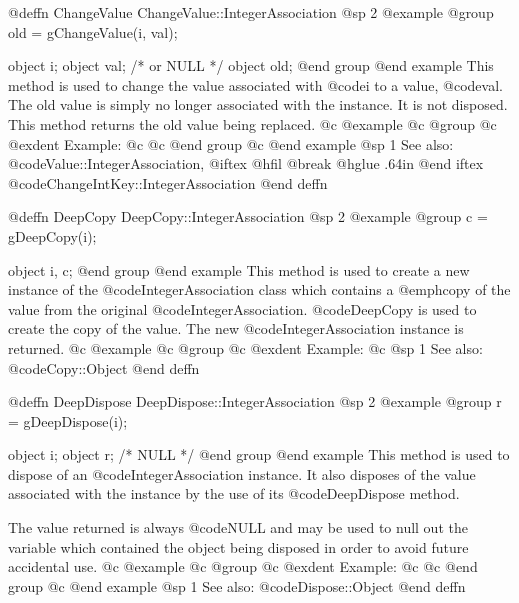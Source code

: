 @deffn {ChangeValue} ChangeValue::IntegerAssociation
@sp 2
@example
@group
old = gChangeValue(i, val);

object  i;
object  val;    /*  or NULL   */
object  old;
@end group
@end example
This method is used to change the value associated with
@code{i} to a value, @code{val}.  The old
value is simply no longer associated with the instance.  It is not
disposed.  This method returns the old value being replaced.
@c @example
@c @group
@c @exdent Example:
@c 
@c @end group
@c @end example
@sp 1
See also:  @code{Value::IntegerAssociation,}
@iftex
@hfil @break @hglue .64in      
@end iftex
@code{ChangeIntKey::IntegerAssociation}
@end deffn










@deffn {DeepCopy} DeepCopy::IntegerAssociation
@sp 2
@example
@group
c = gDeepCopy(i);

object  i, c;
@end group
@end example
This method is used to create a new instance of the
@code{IntegerAssociation} class which contains a @emph{copy} of the value
from the original @code{IntegerAssociation}.  @code{DeepCopy} is used to
create the copy of the value.  The new @code{IntegerAssociation} instance
is returned.
@c @example
@c @group
@c @exdent Example:
@c 
@sp 1
See also:  @code{Copy::Object}
@end deffn













@deffn {DeepDispose} DeepDispose::IntegerAssociation
@sp 2
@example
@group
r = gDeepDispose(i);

object  i;
object  r;     /*  NULL  */
@end group
@end example
This method is used to dispose of an @code{IntegerAssociation} instance.
It also disposes of the value associated with the instance by the
use of its @code{DeepDispose} method.

The value returned is always @code{NULL} and may be used to null out
the variable which contained the object being disposed in order to
avoid future accidental use.
@c @example
@c @group
@c @exdent Example:
@c 
@c @end group
@c @end example
@sp 1
See also:  @code{Dispose::Object}
@end deffn



















